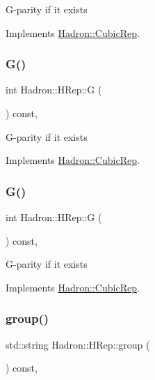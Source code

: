 G-\/parity if it exists 

Implements \mbox{\hyperlink{structHadron_1_1CubicRep_a52104e43266d1614c00bbd1c3b395458}{Hadron\+::\+Cubic\+Rep}}.

\mbox{\label{structHadron_1_1HRep_a131ba3bb47daeaf60d4673a2535a5bb2}} 
\subsubsection{\texorpdfstring{G()}{G()}\hspace{0.1cm}{\footnotesize\ttfamily [2/3]}}
{\footnotesize\ttfamily int Hadron\+::\+H\+Rep\+::G (\begin{DoxyParamCaption}{ }\end{DoxyParamCaption}) const\hspace{0.3cm}{\ttfamily [inline]}, {\ttfamily [virtual]}}

G-\/parity if it exists 

Implements \mbox{\hyperlink{structHadron_1_1CubicRep_a52104e43266d1614c00bbd1c3b395458}{Hadron\+::\+Cubic\+Rep}}.

\mbox{\label{structHadron_1_1HRep_a131ba3bb47daeaf60d4673a2535a5bb2}} 
\subsubsection{\texorpdfstring{G()}{G()}\hspace{0.1cm}{\footnotesize\ttfamily [3/3]}}
{\footnotesize\ttfamily int Hadron\+::\+H\+Rep\+::G (\begin{DoxyParamCaption}{ }\end{DoxyParamCaption}) const\hspace{0.3cm}{\ttfamily [inline]}, {\ttfamily [virtual]}}

G-\/parity if it exists 

Implements \mbox{\hyperlink{structHadron_1_1CubicRep_a52104e43266d1614c00bbd1c3b395458}{Hadron\+::\+Cubic\+Rep}}.

\mbox{\label{structHadron_1_1HRep_afba35b8c5ac09db6b62284283ef291f6}} 
\subsubsection{\texorpdfstring{group()}{group()}\hspace{0.1cm}{\footnotesize\ttfamily [1/3]}}
{\footnotesize\ttfamily std\+::string Hadron\+::\+H\+Rep\+::group (\begin{DoxyParamCaption}{ }\end{DoxyParamCaption}) const\hspace{0.3cm}{\ttfamily [inline]}, {\ttfamily [virtual]}}

